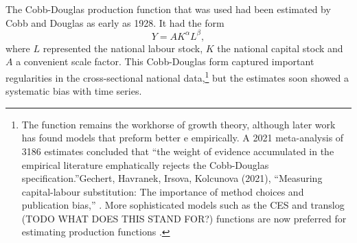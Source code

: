 The \gls{Cobb-Douglas} production function that was used had been estimated by Cobb and Douglas \cite{cobbTheoryProduction1928} as early as 1928. It had the form
\begin{equation*}
Y=AK^\alpha L^\beta, 
 \label{eqn-Cobb-Douglas}    
\end{equation*}
where $L$ represented the national labour stock, $K$ the national capital stock and  $A$ a convenient scale factor. This \gls{Cobb-Douglas} form captured  important regularities in the cross-sectional national data,\footnote{The function remains the workhorse of growth theory, although later work has found models that preform better e empirically.  A 2021 meta-analysis of 3186 estimates concluded that ``the weight of evidence accumulated in the empirical literature emphatically rejects the Cobb-Douglas specification.''Gechert, Havranek, Irsova, Kolcunova (2021), ``Measuring capital-labour substitution: The importance of method choices and publication bias,'' \cite{GET_REF}. %
More sophisticated models such as the CES and translog (TODO WHAT DOES THIS STAND FOR?) functions are now preferred for estimating production functions \cite{GET_REF}.}  %
but the estimates soon showed a systematic bias with time series. 


